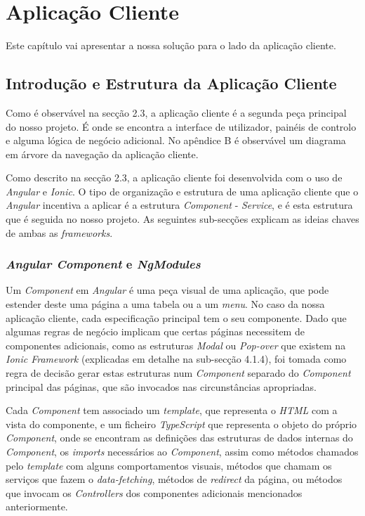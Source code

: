 %

\chapter{Aplicação Cliente} \label{cliente}

Este capítulo vai apresentar a nossa solução para o lado da aplicação cliente.

\section{Introdução e Estrutura da Aplicação Cliente} \label{sec41}
Como é observável na secção 2.3, a aplicação cliente é a segunda peça principal do nosso projeto. É onde se encontra a interface de utilizador, painéis de controlo e alguma lógica de negócio adicional.
No apêndice B é observável um diagrama em árvore da navegação da aplicação cliente.

Como descrito na secção 2.3, a aplicação cliente foi desenvolvida com o uso de \textit{Angular} e \textit{Ionic}. O tipo de organização e estrutura de uma aplicação cliente que o \emph{Angular} incentiva a aplicar é a estrutura \emph{Component} - \emph{Service}, e é esta estrutura que é seguida no nosso projeto.
As seguintes sub-secções explicam as ideias chaves de ambas as \textit{frameworks}.\\

\subsection{\textit{Angular Component} e \textit{NgModules}}\label{sub411}

Um \emph{Component} em \emph{Angular} é uma peça visual de uma aplicação, que pode estender deste uma página a uma tabela ou a um \textit{menu}. No caso da nossa aplicação cliente, cada especificação principal tem o seu componente. Dado que algumas regras de negócio implicam que certas páginas necessitem de componentes adicionais, como as estruturas \emph{Modal} ou \emph{Pop-over} que existem na \emph{Ionic Framework} (explicadas em detalhe na sub-secção 4.1.4), foi tomada como regra de decisão gerar estas estruturas num \emph{Component} separado do \emph{Component} principal das páginas, que são invocados nas circunstâncias apropriadas.

Cada \textit{Component} tem associado um \textit{template}, que representa o \textit{HTML} com a vista do componente, e um ficheiro \textit{TypeScript} que representa o objeto do próprio \textit{Component}, onde se encontram as definições das estruturas de dados internas do \textit{Component}, os \textit{imports} necessários ao \textit{Component}, assim como métodos chamados pelo \textit{template} com alguns comportamentos visuais, métodos que chamam os serviços que fazem o \textit{data-fetching}, métodos de \textit{redirect} da página, ou métodos que invocam os \textit{Controllers} dos componentes adicionais mencionados anteriormente.

